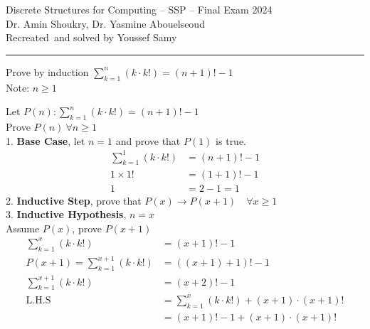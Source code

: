 \documentclass[answers]{exam}
\newcommand{\normalfontsize}{\fontsize{14pt}{16pt}\selectfont}
\newcommand{\titlefontsize}{\fontsize{16pt}{20pt}\selectfont}
\begin{document}
\noindent
\titlefontsize Discrete Structures for Computing -- SSP -- Final Exam 2024\\
\normalfontsize Dr. Amin Shoukry, Dr. Yasmine Abouelseoud\\Recreated{\ifprintanswers~and solved\fi} by Youssef Samy
\hrule
\begin{questions}
    \question Prove by induction $\sum \limits_{k = 1}^{n} (k \cdot k!) = (n + 1)! - 1$\\ Note: $n \ge 1$
    
        \begin{solutionorbox}[19cm]
            Let $P(n): \sum \limits_{k = 1}^{n} (k \cdot k!) = (n + 1)! - 1$\\[+.7em]
            Prove $P(n) ~ \forall n \ge 1 $\\
            1. \textbf{Base Case}, let $n = 1$ and prove that $P(1)$ is true.
            \begin{align*}
                \sum \limits_{k = 1}^{1} (k \cdot k!) & = (n + 1)! - 1 \tag{Base Case} \\
                1 \times 1!                           & = (1+1)! - 1 \tag{Substitute}  \\
                1                                     & = 2 - 1 = 1 \tag{Proven}
            \end{align*}
            2. \textbf{Inductive Step}, prove that $P(x) \rightarrow P(x+1) \quad \forall x \ge 1$\\
            3. \textbf{Inductive Hypothesis}, $n = x$\\
            Assume $P(x)$, prove $P(x+1)$
            \begin{align*}
                \sum \limits_{k = 1}^{x} (k \cdot k!)            & = (x + 1)! - 1 \tag{Assume $P(x)$}                                               \\
                P(x+1) = \sum \limits_{k = 1}^{x+1} (k \cdot k!) & = ((x + 1) + 1)! -1 \tag{R.T.P $P(x+1)$}                                         \\
                \sum \limits_{k = 1}^{x+1} (k \cdot k!)          & = (x + 2)! -1 \tag{Simplify}                                                     \\
                \text{L.H.S}                                     & = \sum \limits_{k = 1}^{x} (k \cdot k!) + (x+1) \cdot (x+1)! \tag{Expand Series} \\
                                                                 & = (x + 1)! - 1 + (x+1) \cdot (x+1)! \tag{Sub. from $P(x)$}                       \\

\end{align*}
\end{solutionorbox}
\end{questions}
\end{document}

